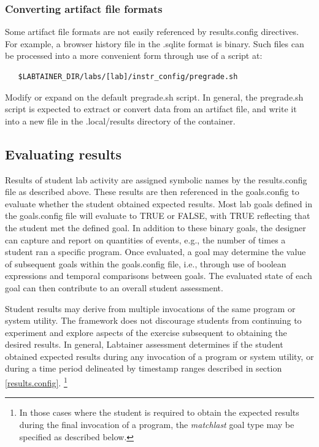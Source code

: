 \documentclass[12pt]{article}
\begin{document}
\subsubsection{Converting artifact file formats}
Some artifact file formats are not easily referenced by results.config directives.
For example, a browser history file in the .sqlite format is binary.  Such files
can be processed into a more convenient form through use of a script at:
\begin{verbatim}
   $LABTAINER_DIR/labs/[lab]/instr_config/pregrade.sh
\end{verbatim}
\noindent Modify or expand on the default pregrade.sh script.
In general, the pregrade.sh script is expected to extract or convert
data from an artifact file, and write it into a new file in the .local/results
directory of the container.   

\subsection{Evaluating results}
\label{goals.config}
Results of student lab activity are assigned symbolic names by the results.config file
as described above.  These results are then referenced in the goals.config to evaluate whether
the student obtained expected results.  Most lab goals defined in the goals.config file
will evaluate to TRUE or FALSE, with TRUE reflecting that the student met the defined goal.
In addition to these binary goals, the designer can capture and report on quantities of events,
e.g., the number of times a student ran a specific program.
Once evaluated, a goal may determine the value of subsequent goals within the goals.config file, 
i.e., through use of boolean expressions and temporal comparisons between goals.  The evaluated
state of each goal can then contribute to an overall student assessment.

Student results may derive from multiple invocations of the same program or system utility.  
The framework does not discourage students from continuing to experiment and explore aspects of the 
exercise subsequent to obtaining the desired results.  In general, Labtainer assessment determines if the student
obtained expected results during any invocation of a program or system utility, or during a time period
delineated by timestamp ranges described in section \ref{results.config}.  \footnote{In those cases 
where the student is required to obtain the expected results during the final invocation of a program, 
the \textit{matchlast} goal type may be specified as described below.}
\end{document}
